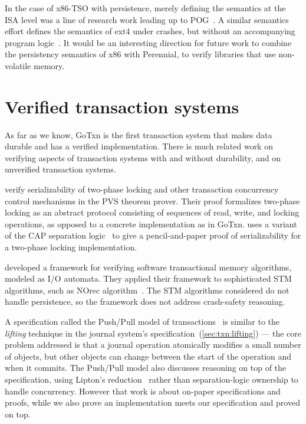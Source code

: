 In the case of x86-TSO with persistence, merely defining the semantics at the
ISA level was a line of research work leading up to
POG~\cite{raad:px86,raad:px86-extended}. A similar semantics effort defines the
semantics of ext4 under crashes, but without an accompanying program
logic~\cite{kokologiannakis:persevere}. It would be an interesting direction for
future work to combine the persistency semantics of x86 with Perennial, to
verify libraries that use non-volatile memory.

\section{Verified transaction systems}
\label{sec:rel:verified-txn}

As far as we know, GoTxn is the first transaction system that makes data durable
and has a verified implementation. There is much related work on verifying
aspects of transaction systems with and without durability, and on unverified
transaction systems.

\citet{ChkliaevHS99} verify serializability of two-phase locking and other
transaction concurrency control mechanisms in the PVS theorem prover. Their
proof formalizes two-phase locking as an abstract protocol consisting of
sequences of read, write, and locking operations, as opposed to a concrete
implementation as in GoTxn. \citet{pollak-2PL} uses a variant of the
CAP separation logic~\citep{dinsdale:cap} to give a pencil-and-paper
proof of serializability for a two-phase locking implementation.

\citet{mohsen:stm} developed a framework for verifying software transactional memory algorithms, modeled
as I/O automata. They applied their framework to sophisticated STM algorithms, such as
NOrec algorithm~\cite{dalessandro:norec}. The STM algorithms considered do not
handle persistence, so the framework does not address crash-safety reasoning.

A specification called the Push/Pull model of
transactions~\cite{koskinen:pushpull} is similar to the \emph{lifting} technique
in the journal system's specification~(\cref{sec:txn:lifting}) --- the core
problem addressed is that a journal operation atomically modifies a small number
of objects, but other objects can change between the start of the operation and when
it commits. The Push/Pull model also discusses reasoning on top of the
specification, using Lipton's reduction~\cite{lipton:movers} rather than
separation-logic ownership to handle concurrency. However that work is about
on-paper specifications and proofs, while we also prove an implementation meets
our specification and proved \simplenfs on top.

